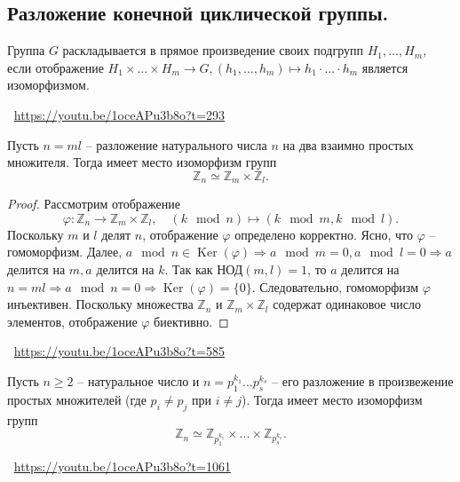 \subsection{Разложение конечной циклической группы.}
\begin{definition}
    Группа $G$ раскладывается в прямое произведение своих подгрупп $H_1, ..., H_m$, если отображение $H_1 \times ... \times H_m \to G, (h_1, ..., h_m) \mapsto h_1 \cdot ... \cdot h_m$ является изоморфизмом.
\end{definition}
\large \faYoutube \normalsize $\>$ \url{https://youtu.be/1oceAPu3b8o?t=293}
\begin{theorem}
    Пусть $n = ml$ -- разложение натурального числа $n$ на два взаимно простых множителя. Тогда имеет место изоморфизм групп
    \[
        \mathbb{Z}_n \simeq \mathbb{Z}_m \times \mathbb{Z}_l.
    \]
    \begin{proof}
        Рассмотрим отображение
        \[
            \varphi : \mathbb{Z}_n \to \mathbb{Z}_m \times \mathbb{Z}_l,
            \quad
            (k \mod n) \mapsto (k \mod m, k \mod l).
        \]
        Поскольку $m$ и $l$ делят $n$, отображение $\varphi$ определено корректно. Ясно, что $\varphi$ -- гомоморфизм.
        \newline
        Далее, $a \mod n \in \operatorname{Ker}(\varphi) \Rightarrow a \mod m = 0, a \mod l = 0 \Rightarrow a $ делится на $ m, a $ делится на $ k$.
        Так как НОД$(m, l) = 1$, то $a$ делится на $n = ml \Rightarrow a \mod n = 0 \Rightarrow \operatorname{Ker}(\varphi) = \{0\}$. Следовательно, гомоморфизм $\varphi$ инъективен. Поскольку множества $\mathbb{Z}_n$ и $\mathbb{Z}_m \times \mathbb{Z}_l$ содержат одинаковое число элементов, отображение $\varphi$ биективно.
    \end{proof}
\end{theorem}
\large \faYoutube \normalsize $\>$ \url{https://youtu.be/1oceAPu3b8o?t=585}
\begin{consequence} \label{rkzg}
    Пусть $n \geqslant 2$ -- натуральное число и $n = p_1^{k_1} ... p_s^{k_s}$ -- его разложение в произвежение простых множителей (где $p_i \neq p_j$ при $i \neq j$). Тогда имеет место изоморфизм групп
    \[
        \mathbb{Z}_n \simeq \mathbb{Z}_{p_1^{k_1}} \times ... \times \mathbb{Z}_{p_s^{k_s}}.
    \]
\end{consequence}
\large \faYoutube \normalsize $\>$ \url{https://youtu.be/1oceAPu3b8o?t=1061}